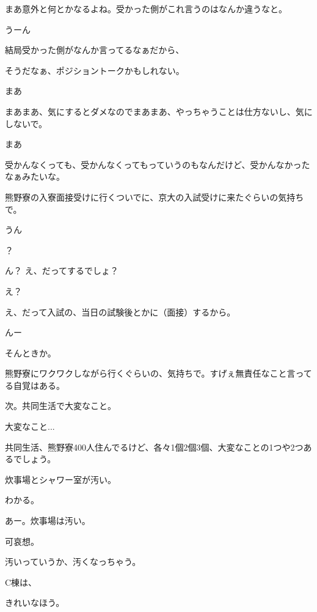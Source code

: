 \begin{multicols}{3}
{        まあ意外と何とかなるよね。受かった側がこれ言うのはなんか違うなと。

        うーん

        結局受かった側がなんか言ってるなぁだから、

        そうだなぁ、ポジショントークかもしれない。

        まあ

        まあまあ、気にするとダメなのでまあまあ、やっちゃうことは仕方ないし、気にしないで。

        まあ

        受かんなくっても、受かんなくってもっていうのもなんだけど、受かんなかったなぁみたいな。

        熊野寮の入寮面接受けに行くついでに、京大の入試受けに来たぐらいの気持ちで。

        うん

        ？

        ん？ え、だってするでしょ？

        え？

        え、だって入試の、当日の試験後とかに（面接）するから。

        んー

        そんときか。

        熊野寮にワクワクしながら行くぐらいの、気持ちで。すげぇ無責任なこと言ってる自覚はある。

        次。共同生活で大変なこと。

        大変なこと...

        共同生活、熊野寮400人住んでるけど、各々1個2個3個、大変なことの1つや2つあるでしょう。

        炊事場とシャワー室が汚い。

        わかる。

        あー。炊事場は汚い。

        可哀想。

        汚いっていうか、汚くなっちゃう。

        C棟は、

        きれいなほう。

}
\end{multicols}
